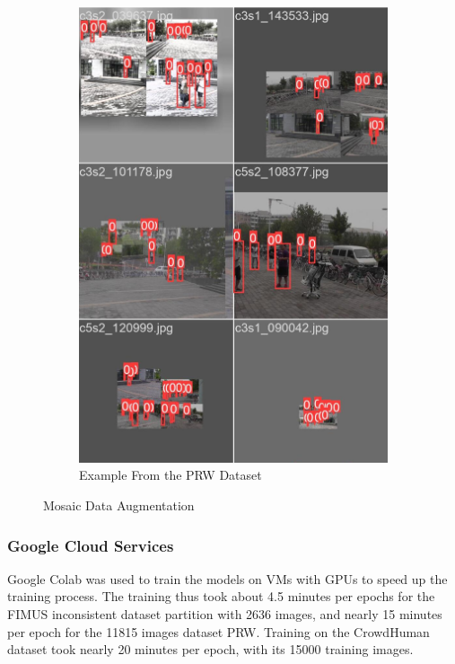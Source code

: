 \begin{figure}[H]
\begin{subfigure}{0.49\textwidth}
        \includegraphics[width=\textwidth]{Images/mosaic_prw.jpg}
        \caption{\centering Example From the PRW Dataset}
    \end{subfigure}
    \caption{\centering Mosaic Data Augmentation}
    \label{fig:mosaic}
\end{figure}

\subsubsection{Google Cloud Services}
Google Colab was used to train the models on VMs with GPUs to speed up the training process. The training thus took about 4.5 minutes per epochs for the FIMUS inconsistent dataset partition with 2636 images, and nearly 15 minutes per epoch for the 11815 images dataset PRW. Training on the CrowdHuman dataset took nearly 20 minutes per epoch, with its 15000 training images. 

